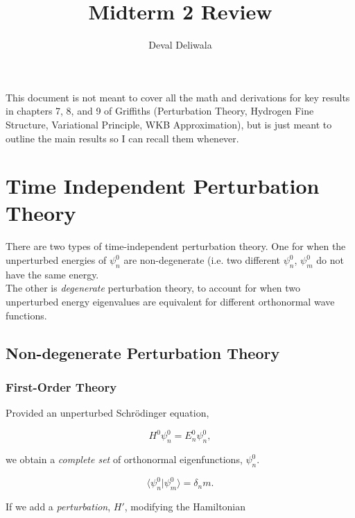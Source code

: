 \documentclass[svgnames]{article}
\title{Midterm 2 Review}
\author{Deval Deliwala}
\begin{document}
\maketitle
\tableofcontents

\vspace{20px}
\begin{center}
  
This document is not meant to cover all the math and derivations for key results in chapters 7, 8, and 9
of Griffiths (Perturbation Theory, Hydrogen Fine Structure, Variational Principle, WKB Approximation), 
but is just meant to outline the main results so I can recall them whenever.  

\end{center}

\newpage 

\section{Time Independent Perturbation Theory}

There are two types of time-independent perturbation theory. One for when the unperturbed energies 
of $\psi_n^{0}$ are non-degenerate (i.e. two different $\psi_n^{0}$, $\psi_m^{0}$ do not have the 
same energy. \\

The other is \textit{degenerate} perturbation theory, to account for when two unperturbed energy
eigenvalues are equivalent for different orthonormal wave functions. 

\subsection{Non-degenerate Perturbation Theory }

\subsubsection{First-Order Theory} 

Provided an unperturbed Schr\"odinger equation, 

\[
H^0 \psi_n^{0} = E_n^{0}\psi_n^0,       
\] \vspace{3px}

we obtain a \textit{complete set} of orthonormal eigenfunctions, $\psi_n^{0}$. 

\[
\langle \psi_n^{0}|\psi_m^{0} \rangle = \delta_nm.
\] \vspace{3px}


If we add a \textit{perturbation}, $H'$, modifying the Hamiltonian 
\end{document}
